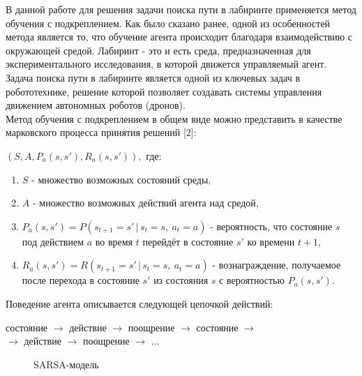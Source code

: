 \documentclass[a4paper]{report}
\theoremstyle{definition}
\theoremstyle{plain}
\theoremstyle{remark}
\theoremstyle{remark}
\theoremstyle{definition}
\begin{document}
В данной работе для решения задачи поиска пути в лабиринте применяется метод обучения с подкреплением. Как было сказано ранее, одной из особенностей метода является то, что обучение агента происходит благодаря взаимодействию с окружающей средой. Лабиринт - это и есть среда, предназначенная для экспериментального исследования, в которой движется управляемый агент. Задача поиска пути в лабиринте является одной из ключевых задач в робототехнике, решение которой позволяет создавать системы управления движением автономных роботов (дронов). \\

Метод обучения с подкреплением в общем виде можно представить в качестве марковского процесса принятия решений [2]:
\begin{center}
	 $ (S, A, P_a(s, s'), R_a(s, s')),$ где:
\end{center}
\begin{enumerate}
 	\item $S$ - множество возможных состояний среды,
 	\item $A$ - множество возможных действий агента над средой,
 	\item $P_a(s, s') = P(s_{t+1}=s'\,|\,s_t=s,\:a_t=a)$ - вероятность, что состояние $s$ под действием $a$ во время $t$ перейдёт в состояние $s'$ ко времени $t+1$,
 	\item $R_a(s, s') = R(s_{t+1}=s'\,|\,s_t=s,\:a_t=a)$ - вознаграждение, получаемое после перехода в состояние $s'$ из состояния $s$ с вероятностью $P_a(s,s')$.
\end{enumerate}


Поведение агента описывается следующей цепочкой действий:
\begin{center}
состояние $\rightarrow$ действие
$\rightarrow$ поощрение $\rightarrow$ состояние $\rightarrow$ \\
$\rightarrow$ действие $\rightarrow$ поощрение $\rightarrow$ ... 
\end{center}

\begin{figure}[h]
	\caption{SARSA-модель}
\end{figure}
\end{document}

